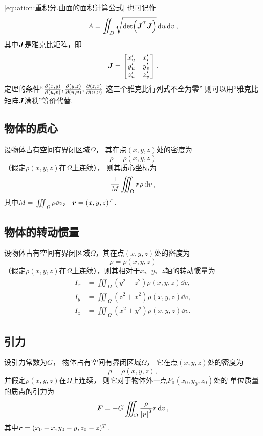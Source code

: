 \cref{equation:重积分.曲面的面积计算公式} 也可记作\[
	A = \iint_D \sqrt{\det(\boldsymbol{J}^T \boldsymbol{J})} \dd{u}\dd{v},
\]
其中\(\boldsymbol{J}\)是雅克比矩阵，即\[
	\boldsymbol{J} = \begin{bmatrix}
		x'_u & x'_v \\
		y'_u & y'_v \\
		z'_u & z'_v
	\end{bmatrix}.
\]
定理的条件“\(\pdv{ (x,y) }{ (u,v) },
\pdv{ (y,z) }{ (u,v) },
\pdv{ (z,x) }{ (u,v) }\)
这三个雅克比行列式不全为零”
则可以用“雅克比矩阵\(\boldsymbol{J}\)满秩”等价代替.

\subsection{物体的质心}
\begin{theorem}
设物体占有空间有界闭区域\(\Omega\)，
其在点\((x,y,z)\)处的密度为\[
	\rho=\rho(x,y,z)
\]
（假定\(\rho(x,y,z)\)在\(\Omega\)上连续），
则其质心坐标为\begin{equation}
	\frac{1}{M} \iiint_{\Omega} \boldsymbol{r} \rho \dd{v},
\end{equation}
其中\(M = \iiint_{\Omega} \rho \dd{v}\)，
\(\boldsymbol{r} = (x,y,z)^T\).
\end{theorem}

\subsection{物体的转动惯量}
\begin{theorem}
设物体占有空间有界闭区域\(\Omega\)，其在点\((x,y,z)\)处的密度为\[
\rho=\rho(x,y,z)
\]（假定\(\rho(x,y,z)\)在\(\Omega\)上连续），则其相对于\(x\)、\(y\)、\(z\)轴的转动惯量为\begin{align}
I_x &= \iiint_{\Omega} (y^2+z^2) \rho(x,y,z) \dd{v}, \\
I_y &= \iiint_{\Omega} (z^2+x^2) \rho(x,y,z) \dd{v}, \\
I_z &= \iiint_{\Omega} (x^2+y^2) \rho(x,y,z) \dd{v}.
\end{align}
\end{theorem}

\subsection{引力}
\begin{theorem}
设引力常数为\(G\)，
物体占有空间有界闭区域\(\Omega\)，
它在点\((x,y,z)\)处的密度为\[
	\rho=\rho(x,y,z),
\]
并假定\(\rho(x,y,z)\)在\(\Omega\)上连续，
则它对于物体外一点\(P_0(x_0,y_0,z_0)\)处的
单位质量的质点的引力为\begin{equation}
	\boldsymbol{F}
	= -G \iiint_\Omega \frac{\rho}{\abs{\boldsymbol{r}}^3} \boldsymbol{r} \dd{v},
\end{equation}
其中\(\boldsymbol{r}
= (x_0-x,y_0-y,z_0-z)^T\).
\end{theorem}

